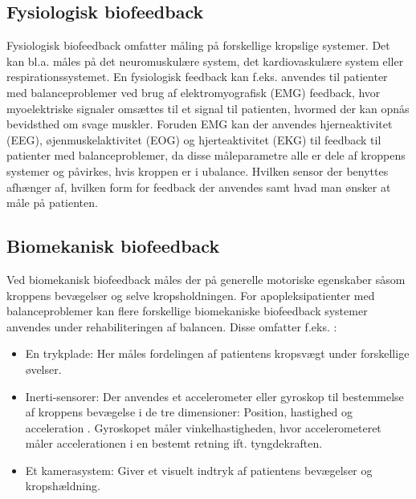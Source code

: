 \subsection{Fysiologisk biofeedback}
Fysiologisk biofeedback omfatter måling på forskellige kropslige systemer. Det kan bl.a. måles på det neuromuskulære system, det kardiovaskulære system eller respirationssystemet.  En fysiologisk feedback kan f.eks. anvendes til patienter med balanceproblemer ved brug af elektromyografisk (EMG) feedback, hvor myoelektriske signaler omsættes til et signal til patienten,  hvormed der kan opnås bevidsthed om svage muskler. Foruden EMG kan der anvendes hjerneaktivitet (EEG), øjenmuskelaktivitet (EOG) og hjerteaktivitet (EKG) til feedback til patienter med balanceproblemer, da disse måleparametre alle er dele af kroppens systemer og påvirkes, hvis kroppen er i ubalance. Hvilken sensor der benyttes afhænger af, hvilken form for feedback der anvendes samt hvad man ønsker at måle på patienten. \cite{Prentice2007}


\subsection{Biomekanisk biofeedback}\label{MekBioFeed}
Ved biomekanisk biofeedback måles der på generelle motoriske egenskaber såsom kroppens bevægelser og selve kropsholdningen. For apopleksipatienter med balanceproblemer kan flere forskellige biomekaniske biofeedback systemer anvendes under rehabiliteringen af balancen. Disse omfatter f.eks. \cite{Giggins2013}:
\begin{itemize}
\item En trykplade: Her måles fordelingen af patientens kropsvægt under forskellige øvelser. 
\item Inerti-sensorer: Der anvendes et accelerometer eller gyroskop til bestemmelse af kroppens bevægelse i de tre dimensioner: Position, hastighed og acceleration . Gyroskopet måler vinkelhastigheden, hvor accelerometeret måler accelerationen i en bestemt retning ift. tyngdekraften.
\item Et kamerasystem: Giver et visuelt indtryk af patientens bevægelser og kropshældning. 
\end{itemize}

